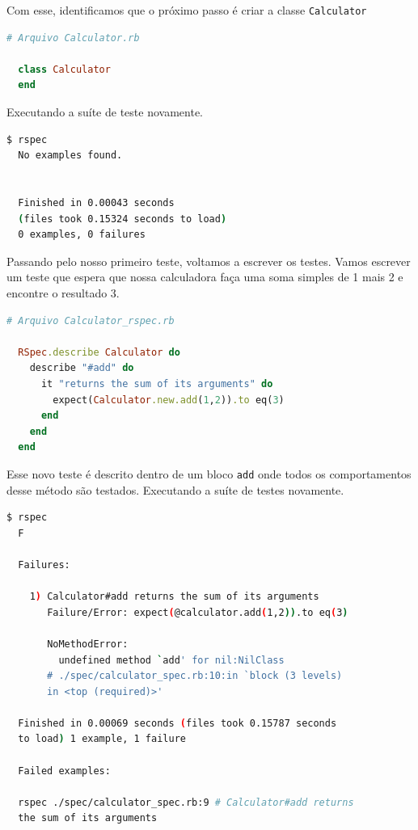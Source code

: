 \documentclass[12pt]{article}
\newcommand{\code}[1]{\texttt{#1}}
\begin{document}
  Com esse, identificamos que o próximo passo é criar a classe \code{Calculator}

  \begin{lstlisting}[language=Ruby]
  # Arquivo Calculator.rb

  class Calculator
  end
  \end{lstlisting}

  Executando a suíte de teste novamente.

  \begin{lstlisting}[language=bash]
  $ rspec
  No examples found.


  Finished in 0.00043 seconds 
  (files took 0.15324 seconds to load)
  0 examples, 0 failures
  \end{lstlisting}

  Passando pelo nosso primeiro teste, voltamos a escrever os testes. Vamos 
  escrever um teste que espera que nossa calculadora faça uma soma simples de 
  1 mais 2 e encontre o resultado 3.

  \begin{lstlisting}[language=Ruby]
  # Arquivo Calculator_rspec.rb

  RSpec.describe Calculator do
    describe "#add" do
      it "returns the sum of its arguments" do
        expect(Calculator.new.add(1,2)).to eq(3)
      end
    end
  end
  \end{lstlisting}

  Esse novo teste é descrito dentro de um bloco \code{add} onde todos os 
  comportamentos desse método são testados. Executando a suíte de testes
  novamente.

  \begin{lstlisting}[language=bash]
  $ rspec
  F

  Failures:

    1) Calculator#add returns the sum of its arguments 
       Failure/Error: expect(@calculator.add(1,2)).to eq(3)
       
       NoMethodError:
         undefined method `add' for nil:NilClass
       # ./spec/calculator_spec.rb:10:in `block (3 levels) 
       in <top (required)>'

  Finished in 0.00069 seconds (files took 0.15787 seconds 
  to load) 1 example, 1 failure

  Failed examples:

  rspec ./spec/calculator_spec.rb:9 # Calculator#add returns 
  the sum of its arguments 
  \end{lstlisting}
  
\end{document}
